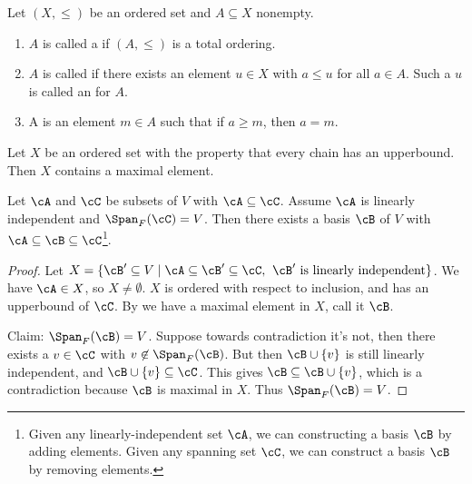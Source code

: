     \begin{definition}
        Let $(X,\leq)$ be an ordered set and $A \subseteq X$ nonempty.
        \begin{enumerate}[label = (\arabic*)]
            \item $A$ is called a  if $(A,\leq)$ is a total ordering.
            \item $A$ is called  if there exists an element $u \in X$ with $a \leq u$ for all $a \in A$. Such a $u$ is called an  for $A$.
            \item A  is an element $m \in A$ such that if $a \geq m$, then $a = m$.
        \end{enumerate}
    \end{definition}

    \begin{lemma}\label{lemma:zorns}
        Let $X$ be an ordered set with the property that every chain has an upperbound. Then $X$ contains a maximal element.
    \end{lemma}

    \begin{theorem}
        Let $\cA$ and $\cC$ be subsets of $V$ with $\cA \subseteq \cC$. Assume $\cA$ is linearly independent and $\Span_F{(\cC)} = V$. Then there exists a basis $\cB$ of $V$ with $\cA \subseteq \cB \subseteq \cC$\footnote{Given any linearly-independent set $\cA$, we can constructing a basis $\cB$ by adding elements. Given any spanning set $\cC$, we can construct a basis $\cB$ by removing elements.}.
    \end{theorem}
        \begin{proof}
            Let $X = \{\cB' \subseteq V \mid \cA \subseteq \cB' \subseteq \cC, \hspace{4pt} \text{$\cB'$ is linearly independent}\}$. We have $\cA \in X$, so $X \neq \emptyset$. $X$ is ordered with respect to inclusion, and has an upperbound of $\cC$. By  we have a maximal element in $X$, call it $\cB$. 
            
            Claim: $\Span_F{(\cB)} = V$. Suppose towards contradiction it's not, then there exists a $v \in \cC$ with $v \not\in \Span_F{(\cB)}$. But then $\cB \cup \{v\}$ is still linearly independent, and $\cB \cup \{v\} \subseteq \cC$. This gives $\cB \subseteq \cB \cup \{v\}$, which is a contradiction because $\cB$ is maximal in $X$. Thus $\Span_F{(\cB)} = V$.
        \end{proof}

